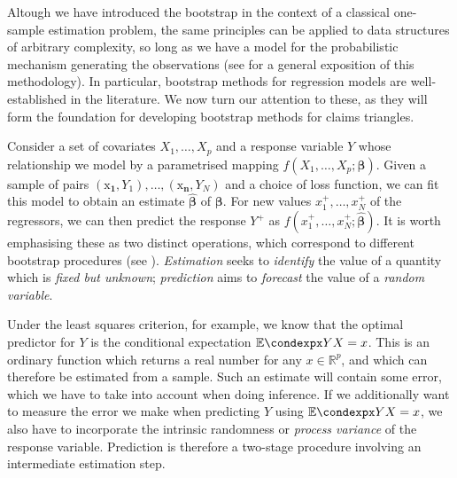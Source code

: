 \documentclass[a4paper]{book}
\begin{document}
Altough we have introduced the bootstrap in the context of a classical one-sample estimation problem, the same principles can be applied to data structures of arbitrary complexity, so long as we have a model for the probabilistic mechanism generating the observations (see \cite[Chapter 8]{efron:intro} for a general exposition of this methodology). In particular, bootstrap methods for regression models are well-established in the literature. We now turn our attention to these, as they will form the foundation for developing bootstrap methods for claims triangles.

Consider a set of covariates $X_1, \dots, X_p$ and a response variable $Y$ whose relationship we model by a parametrised mapping $f(X_1, \dots, X_p; \bm{\beta})$. Given a sample of pairs $(\bm{\mathrm{x}_1}, Y_1), \dots, (\bm{\mathrm{x}_n}, Y_N)$ and a choice of loss function, we can fit this model to obtain an estimate $\widehat{\bm{\beta}}$ of $\bm{\beta}$. For new values $x_1^+, \dots, x_N^+$ of the regressors, we can then predict the response $Y^+$ as $f(x_1^+, \dots, x_N^+; \widehat{\bm{\beta}})$. It is worth emphasising these as two distinct operations, which correspond to different bootstrap procedures (see \cite[Sections 6.3.3 and 7.2.4]{davison}). \emph{Estimation} seeks to \emph{identify} the value of a quantity which is \emph{fixed but unknown}; \emph{prediction} aims to \emph{forecast} the value of a \emph{random variable}.

Under the least squares criterion, for example, we know that the optimal predictor for $Y$ is the conditional expectation $\condexp{Y}{X = x}$. This is an ordinary function which returns a real number for any $x \in \mathbb{R}^p$, and which can therefore be estimated from a sample. Such an estimate will contain some error, which we have to take into account when doing inference. If we additionally want to measure the error we make when predicting $Y$ using $\condexp{Y}{X = x}$, we also have to incorporate the intrinsic randomness or \emph{process variance} of the response variable. Prediction is therefore a two-stage procedure involving an intermediate estimation step.
\end{document}
